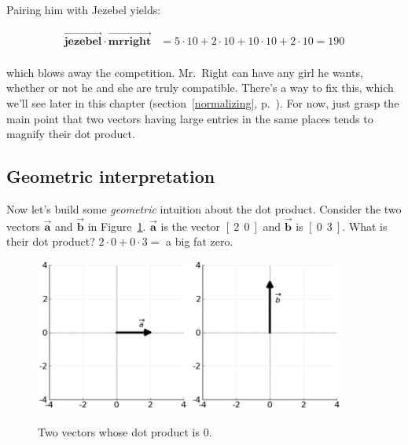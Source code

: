 Pairing him with Jezebel yields:

\vspace{-.15in}
\begin{align*}
\overrightarrow{\textbf{jezebel}} \cdot \overrightarrow{\textbf{mrright}} &=
5 \cdot 10 + 2 \cdot 10 + 10 \cdot 10 + 2 \cdot 10 = 190 \\
\end{align*}
\vspace{-.25in}

which blows away the competition. Mr.~Right can have any girl he wants, whether
or not he and she are truly compatible. There's a way to fix this, which we'll
see later in this chapter (section~\ref{normalizing},
p.~\pageref{normalizing}). For now, just grasp the main point that two vectors
having large entries in the same places tends to magnify their dot product.

\bigskip
\bigskip
\phantom{.}

\subsection{Geometric interpretation}

Now let's build some \textit{geometric} intuition about the dot product.
Consider the two vectors $\overrightarrow{\textbf{a}}$ and
$\overrightarrow{\textbf{b}}$ in Figure~\ref{fig:dotproduct1}.
$\overrightarrow{\textbf{a}}$ is the vector $[\ 2\ \ 0\ ]$ and
$\overrightarrow{\textbf{b}}$ is $[\ 0\ \ 3\ ]$. What is their dot product?
$2\cdot 0 + 0\cdot 3 = $ a big fat zero.

\begin{figure}[ht]
\centering
\includegraphics[width=0.45\textwidth]{dotProduct1a.png}
\includegraphics[width=0.45\textwidth]{dotProduct1b.png}
\caption{Two vectors whose dot product is 0.}
\label{fig:dotproduct1}
\end{figure}

